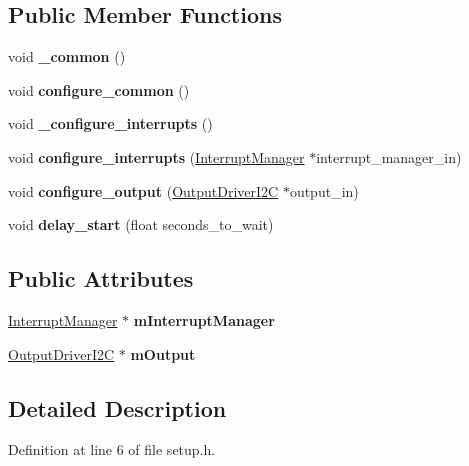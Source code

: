 \subsection*{Public Member Functions}
\begin{DoxyCompactItemize}
\item 
void {\bfseries \+\_\+common} ()\hypertarget{classSPMB_1_1SetupManager_a1c09eba4b47ad6012b6d3ced131da0a4}{}\label{classSPMB_1_1SetupManager_a1c09eba4b47ad6012b6d3ced131da0a4}

\item 
void {\bfseries configure\+\_\+common} ()\hypertarget{classSPMB_1_1SetupManager_ae32219bb0aadfbfa2db519a6ebb58555}{}\label{classSPMB_1_1SetupManager_ae32219bb0aadfbfa2db519a6ebb58555}

\item 
void {\bfseries \+\_\+configure\+\_\+interrupts} ()\hypertarget{classSPMB_1_1SetupManager_ad22820d8804c92c80f06c267486f3cc8}{}\label{classSPMB_1_1SetupManager_ad22820d8804c92c80f06c267486f3cc8}

\item 
void {\bfseries configure\+\_\+interrupts} (\hyperlink{classSPMB_1_1InterruptManager}{Interrupt\+Manager} $\ast$interrupt\+\_\+manager\+\_\+in)\hypertarget{classSPMB_1_1SetupManager_a5e594557d762d7d7b5141bb1f8cf5227}{}\label{classSPMB_1_1SetupManager_a5e594557d762d7d7b5141bb1f8cf5227}

\item 
void {\bfseries configure\+\_\+output} (\hyperlink{classSPMB_1_1OutputDriverI2C}{Output\+Driver\+I2C} $\ast$output\+\_\+in)\hypertarget{classSPMB_1_1SetupManager_a4e7be3a3f5e5c073a45f5059d56639eb}{}\label{classSPMB_1_1SetupManager_a4e7be3a3f5e5c073a45f5059d56639eb}

\item 
void {\bfseries delay\+\_\+start} (float seconds\+\_\+to\+\_\+wait)\hypertarget{classSPMB_1_1SetupManager_ac81e9e0b26c8560fe12ba38f3147bf8d}{}\label{classSPMB_1_1SetupManager_ac81e9e0b26c8560fe12ba38f3147bf8d}

\end{DoxyCompactItemize}
\subsection*{Public Attributes}
\begin{DoxyCompactItemize}
\item 
\hyperlink{classSPMB_1_1InterruptManager}{Interrupt\+Manager} $\ast$ {\bfseries m\+Interrupt\+Manager}\hypertarget{classSPMB_1_1SetupManager_a29f2062c536ba2b74bda1937e10d3351}{}\label{classSPMB_1_1SetupManager_a29f2062c536ba2b74bda1937e10d3351}

\item 
\hyperlink{classSPMB_1_1OutputDriverI2C}{Output\+Driver\+I2C} $\ast$ {\bfseries m\+Output}\hypertarget{classSPMB_1_1SetupManager_a3cd847b570298f79a6a9d1d86e556377}{}\label{classSPMB_1_1SetupManager_a3cd847b570298f79a6a9d1d86e556377}

\end{DoxyCompactItemize}


\subsection{Detailed Description}


Definition at line 6 of file setup.\+h.

